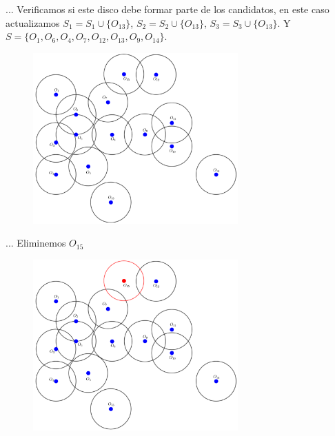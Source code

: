 \begin{frame}{...}
  Verificamos si este disco debe formar parte de los candidatos,
  en este caso actualizamos $S_1 = S_1 \cup \{O_{13}\}$, $S_2 = S_2 \cup \{O_{13}\}$,
  $S_3 = S_3 \cup \{O_{13}\}$. Y  $S = \{O_1, O_6, O_4, O_7, O_{12}, O_{13}, O_9, O_{14}\}$.
  \begin{figure}  
    \centering
    \includegraphics[width=0.7\textwidth]{./Images/06.png}
  \end{figure}
\end{frame}

\begin{frame}{...}
  Eliminemos $O_{15}$
  \begin{figure}  
    \centering
    \includegraphics[width=0.7\textwidth]{./Images/07.png}
  \end{figure}
\end{frame}

